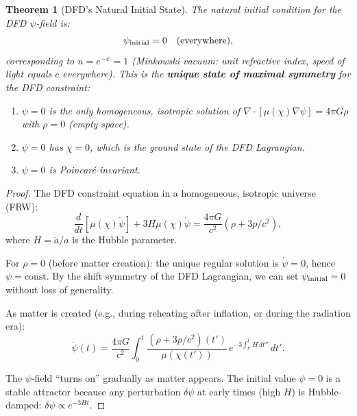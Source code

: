 \documentclass[11pt,a4paper]{article}
\newtheorem{theorem}{Theorem}
\begin{document}
\begin{theorem}[DFD's Natural Initial State]
\label{thm:initial-psi}
The natural initial condition for the DFD $\psi$-field is:
\begin{equation}\label{eq:psi-initial}
\psi_{\rm initial} = 0 \quad\text{(everywhere)},
\end{equation}
corresponding to $n = e^{-\psi} = 1$ (Minkowski vacuum: unit refractive index, speed of light equals $c$ everywhere). This is the \textbf{unique state of maximal symmetry} for the DFD constraint:
\begin{enumerate}
\item $\psi = 0$ is the only homogeneous, isotropic solution of $\nabla\cdot[\mu(\chi)\nabla\psi] = 4\pi G\rho$ with $\rho = 0$ (empty space).
\item $\psi = 0$ has $\chi = 0$, which is the ground state of the DFD Lagrangian.
\item $\psi = 0$ is Poincar\'e-invariant.
\end{enumerate}
\end{theorem}

\begin{proof}
The DFD constraint equation in a homogeneous, isotropic universe (FRW):
\begin{equation}
\frac{d}{dt}\left[\mu(\chi)\dot\psi\right] + 3H\mu(\chi)\dot\psi = \frac{4\pi G}{c^2}(\rho + 3p/c^2),
\end{equation}
where $H = \dot{a}/a$ is the Hubble parameter.

For $\rho = 0$ (before matter creation): the unique regular solution is $\dot\psi = 0$, hence $\psi = \text{const}$. By the shift symmetry of the DFD Lagrangian, we can set $\psi_{\rm initial} = 0$ without loss of generality.

As matter is created (e.g., during reheating after inflation, or during the radiation era):
\begin{equation}
\dot\psi(t) = \frac{4\pi G}{c^2}\int_0^t \frac{(\rho + 3p/c^2)(t')}{\mu(\chi(t'))}\,e^{-3\int_{t'}^t H\,dt''}\,dt'.
\end{equation}

The $\psi$-field ``turns on'' gradually as matter appears. The initial value $\psi = 0$ is a stable attractor because any perturbation $\delta\psi$ at early times (high $H$) is Hubble-damped: $\delta\psi \propto e^{-3Ht}$.
\end{proof}
\end{document}
